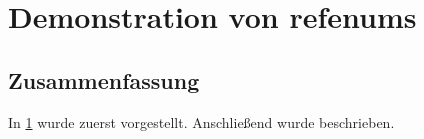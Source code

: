 \usepackage{calc}

\usepackage[normalem]{ulem} %

\usepackage{layout} %

\section{Demonstration von refenums}
\label{sec:method}

\label{sec:rqa}
\lipsum

\lipsum

\subsection{Zusammenfassung}
In \cref{sec:method} wurde zuerst  vorgestellt.
Anschließend wurde  beschrieben.

